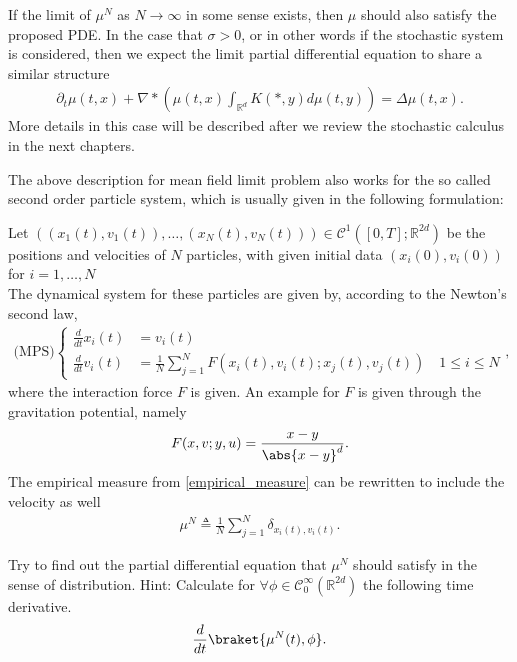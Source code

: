 \begin{note}
	If the limit of $\mu^N$ as $N\to \infty$ in some sense exists, then $\mu $ should also satisfy the proposed PDE.
	In the case that $\sigma  > 0$, or in other words if the stochastic system is considered, then we expect the limit partial differential equation to share a similar structure
	\begin{align*}
		\partial_t \mu(t,x) + \nabla * \left( \mu(t,x) \int_{\mathbb{R}^{d} } K(*,y) d\mu(t,y) \right)  = \Delta \mu(t,x)
		.\end{align*}
	More details  in this case will be described after we review the stochastic calculus in the next chapters.
\end{note}

\vskip5mm

The above description for mean field limit problem also works for the so called second order particle system, which is usually given in the following formulation:
\begin{Definition}
Let $  ((x_{1}(t),v_{1}(t)),\ldots ,(x_N(t),v_N(t))) \in \mathcal{C}^{1}([0,T];\mathbb{R}^{2d} ) $ be the positions and velocities of $N$ particles, with given initial data
$(x_i(0),v_i(0))$  for $i = 1,\ldots ,N$\\[1ex]
The dynamical system for these particles are given by, according to the Newton's second law,
\begin{align*}
	\text{(MPS)}\begin{cases}
		            \frac{d}{dt} x_i(t) & = v_i(t)                                                                            \\
		            \frac{d}{dt} v_i(t) & = \frac{1}{N} \sum_{j=1}^{N} F(x_{i}(t),v_i(t) ; x_j(t),v_j(t) )  \quad 1\le i\le N
	            \end{cases}
	,\end{align*}
where the interaction force $F$ is given. An example for $F$ is given through the gravitation potential, namely
\begin{align*}
	F(x,v;y,u) = \frac{x-y}{\abs{x-y}^{d} }
	.\end{align*}
The empirical measure from \autoref{empirical_measure} can be rewritten to include the velocity as well
\begin{align*}
	\mu^N \triangleq \frac{1}{N} \sum_{j=1}^{N} \delta_{x_i(t),v_i(t)}
	.\end{align*}
\end{Definition}
\begin{exercise}
	Try to find out the partial differential equation that $\mu^N$ should satisfy in the sense of distribution. Hint: Calculate  for $\forall  \phi  \in  \mathcal{C}_0^{\infty}(\mathbb{R}^{2d} ) $  the following time derivative.
	\begin{align*}
		\frac{d}{dt} \braket{\mu^N(t),\phi }
		.\end{align*}
\end{exercise}
